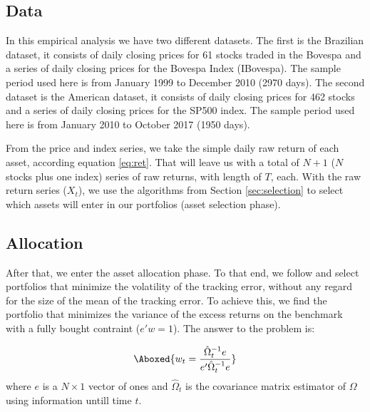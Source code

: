 \documentclass[preprint, doubleblind, authoryear,10pt]{elsarticle}
\begin{document}
\subsection{Data} \label{sec:data}

In this empirical analysis we have two different datasets.
The first is the Brazilian dataset, it consists of daily closing prices for 61 stocks traded in the Bovespa and a series of daily closing prices for the Bovespa Index (IBovespa).
The sample period used here is from January 1999 to December 2010 (2970 days).
The second dataset is the American dataset, it consists of daily closing prices for 462 stocks and a series of daily closing prices for the SP500 index.
The sample period used here is from January 2010 to October 2017 (1950 days).

From the price and index series, we take the simple daily raw return of each asset, according equation \eqref{eq:ret}.
That will leave us with a total of $N+1$ ($N$ stocks plus one index) series of raw returns, with length of $T$, each.
With the raw return series ($X_{t}$), we use the algorithms from Section \ref{sec:selection} to select which assets will enter in our portfolios (asset selection phase).

\subsection*{Allocation}
After that, we enter the asset allocation phase.
To that end, we follow \cite{liu-2009} and select portfolios that minimize the volatility of the tracking error, without any regard for the size of the mean of the tracking error.
To achieve this, we find the portfolio that minimizes the variance of the excess returns on the benchmark with a fully bought contraint ($e'w=1$).
The answer to the problem is:

\begin{align} \label{eq:gmv}
\Aboxed{%
w_{t} = \frac{\hat{\Omega}_{t}^{-1}e}{e'\hat{\Omega}_{t}^{-1}e} }
\end{align}
where $e$ is a $N \times 1$ vector of ones and $\hat{\Omega}_{t}$ is the covariance matrix estimator of $\Omega$ using information untill time $t$.
\end{document}
